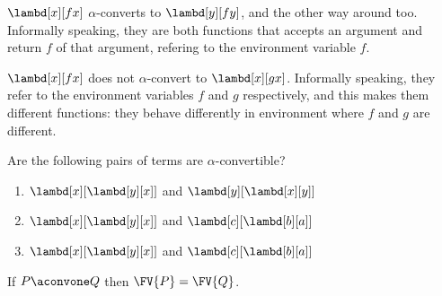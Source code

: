 \documentclass[../../../include/open-logic-section]{subfiles}
\begin{document}
\begin{ex}
  $\lambd[x][f x]$ $\alpha$-converts to $\lambd[y][f
  y]$, and the other way around too. Informally
  speaking, they are both functions that accepts an argument and
  return $f$ of that argument, refering to the environment variable $f$.
\end{ex}

\begin{ex}
  $\lambd[x][f x]$ does not $\alpha$-convert to $\lambd[x][g
    x]$. Informally speaking, they refer to the environment variables
  $f$ and $g$ respectively, and this makes them different functions: they
  behave differently in environment where $f$ and $g$ are different.
\end{ex}

\begin{prob}
  Are the following pairs of terms are $\alpha$-convertible?
  \begin{enumerate}
  \item $\lambd[x][\lambd[y][x]]$ and $\lambd[y][\lambd[x][y]]$
  \item $\lambd[x][\lambd[y][x]]$ and $\lambd[c][\lambd[b][a]]$
  \item $\lambd[x][\lambd[y][x]]$ and $\lambd[c][\lambd[b][a]]$
  \end{enumerate}
\end{prob}

\begin{lem}
  If $P \aconvone Q$ then $\FV{P} = \FV{Q}$.
\end{lem}
\end{document}
